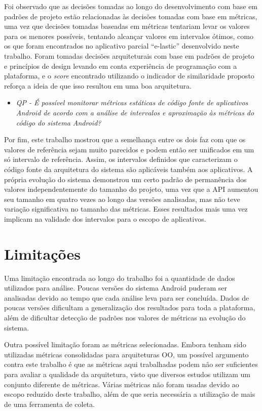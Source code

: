 Foi observado que as decisões tomadas ao longo do desenvolvimento com base em padrões de projeto estão relacionadas às decisões tomadas com base em métricas, uma vez que decisões tomadas baseadas em métricas tentariam levar os valores para os menores possíveis, tentando alcançar valores em intervalos ótimos, como os que foram encontrados no aplicativo parcial ``e-lastic'' desenvolvido neste trabalho. Foram tomadas decisões arquiteturais com base em padrões de projeto e princípios de design levando em conta experiência de programação com a plataforma, e o \textit{score} encontrado utilizando o indicador de similaridade proposto reforça a ideia de que isso resultou em uma boa arquitetura.

\begin{itemize}
\item \textit{QP - É possível monitorar métricas estáticas de código fonte de aplicativos Android de acordo com a análise de intervalos e aproximação às métricas do código do sistema Android?}
\end{itemize}

Por fim, este trabalho mostrou que a semelhança entre os dois faz com que os valores de referência sejam muito parecidos e podem então ser unificados em um só intervalo de referência. Assim, os intervalos definidos que caracterizam o código fonte da arquitetura do sistema são aplicáveis também aos aplicativos. A própria evolução do sistema demonstrou um certo padrão de permanência dos valores independentemente do tamanho do projeto, uma vez que a API aumentou seu tamanho em quatro vezes ao longo das versões analisadas, mas não teve variação significativa no tamanho das métricas. Esses resultados mais uma vez implicam na validade dos intervalos para o escopo de aplicativos.

\section{Limitações}

Uma limitação encontrada ao longo do trabalho foi a quantidade de dados utilizados para análise. Poucas versões do sistema Android puderam ser analisadas devido ao tempo que cada análise leva para ser concluída. Dados de poucas versões dificultam a generalização dos resultados para toda a plataforma, além de dificultar detecção de padrões nos valores de métricas na evolução do sistema.

Outra possível limitação foram as métricas selecionadas. Embora tenham sido utilizadas métricas consolidadas para arquiteturas OO, um possível argumento contra este trabalho é que as métricas aqui trabalhadas podem não ser suficientes para avaliar a qualidade da arquitetura, visto que diversos estudos utilizam um conjunto diferente de métricas. Várias métricas não foram usadas devido ao escopo reduzido deste trabalho, além de que seria necessária a utilização de mais de uma ferramenta de coleta.


